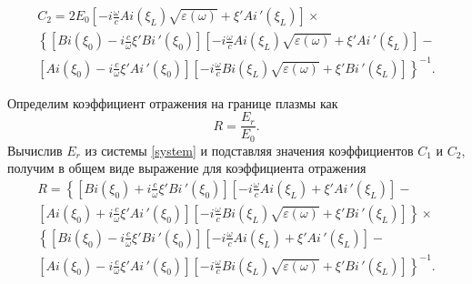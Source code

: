 \documentclass[12pt,a4paper]{article}
\numberwithin{equation}{section}
\begin{document}
\begin{equation}
    \label{C2_common}
    \begin{array}{lcl}
         C_2 = 2E_0\left[-i\frac{\omega}{c}Ai\left(\xi_L\right)\sqrt{\varepsilon\left(\omega\right)}+\xi'Ai\,'\left(\xi_L\right)\right]\times \\
       \left\{\left[Bi\left(\xi_0\right)-i\frac{c}{\omega}\xi'Bi\,'\left(\xi_0\right)\right]\left[-i\frac{\omega}{c}Ai\left(\xi_L\right)\sqrt{\varepsilon\left(\omega\right)}+\xi'Ai\,'\left(\xi_L\right)\right] - \right.\\ 
       \left.\left[Ai\left(\xi_0\right)-i\frac{c}{\omega}\xi'Ai\,'\left(\xi_0\right)\right]\left[-i\frac{\omega}{c}Bi\left(\xi_L\right)\sqrt{\varepsilon\left(\omega\right)}+\xi'Bi\,'\left(\xi_L\right)\right]\right\}^{-1}.
    \end{array}
\end{equation}

Определим коэффициент отражения на границе плазмы как
\begin{equation}
    \label{refl}
    R = \frac{E_r}{E_0}.
\end{equation}
Вычислив $E_r$ из системы \eqref{system} и подставляя значения коэффициентов $C_1$ и $C_2$, получим в общем виде выражение для коэффициента отражения
\begin{equation}
\label{coeff}
\begin{array}{lcl}
  R = \left\{\left[Bi\left(\xi_0\right)+i\frac{c}{\omega}\xi'Bi\,'\left(\xi_0\right)\right]\left[-i\frac{\omega}{c}Ai\left(\xi_L\right)+\xi'Ai\,'\left(\xi_L\right)\right] - \right. \\
  \left.\left[Ai\left(\xi_0\right)+i\frac{c}{\omega}\xi'Ai\,'\left(\xi_0\right)\right]\left[-i\frac{\omega}{c}Bi\left(\xi_L\right)\sqrt{\varepsilon\left(\omega\right)}+\xi'Bi\,'\left(\xi_L\right)\right]\right\}\times \\
  \left\{\left[Bi\left(\xi_0\right)-i\frac{c}{\omega}\xi'Bi\,'\left(\xi_0\right)\right]\left[-i\frac{\omega}{c}Ai\left(\xi_L\right)+\xi'Ai\,'\left(\xi_L\right)\right] \right. -\\
   \left.\left[Ai\left(\xi_0\right)-i\frac{c}{\omega}\xi'Ai\,'\left(\xi_0\right)\right]\left[-i\frac{\omega}{c}Bi\left(\xi_L\right)\sqrt{\varepsilon\left(\omega\right)}+\xi'Bi\,'\left(\xi_L\right)\right]\right\}^{-1}.
\end{array}
\end{equation}
\end{document}
